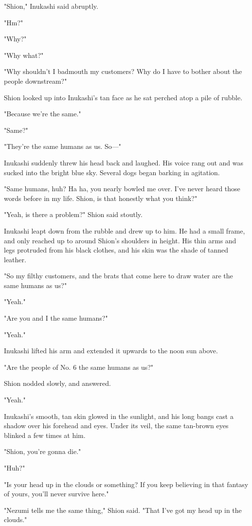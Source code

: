 "Shion," Inukashi said abruptly.

"Hm?"

"Why?"

"Why what?"

"Why shouldn't I badmouth my customers? Why do I have to bother about
the people downstream?"

Shion looked up into Inukashi's tan face as he sat perched atop a pile
of rubble.

"Because we're the same."

"Same?"

"They're the same humans as us. So---"

Inukashi suddenly threw his head back and laughed. His voice rang out
and was sucked into the bright blue sky. Several dogs began barking in
agitation.

"Same humans, huh? Ha ha, you nearly bowled me over. I've never heard
those words before in my life. Shion, is that honestly what you think?"

"Yeah, is there a problem?" Shion said stoutly.

Inukashi leapt down from the rubble and drew up to him. He had a small
frame, and only reached up to around Shion's shoulders in height. His
thin arms and legs protruded from his black clothes, and his skin was
the shade of tanned leather.

"So my filthy customers, and the brats that come here to draw water are
the same humans as us?"

"Yeah."

"Are you and I the same humans?"

"Yeah."

Inukashi lifted his arm and extended it upwards to the noon sun above.

"Are the people of No. 6 the same humans as us?"

Shion nodded slowly, and answered.

"Yeah."

Inukashi's smooth, tan skin glowed in the sunlight, and his long bangs
cast a shadow over his forehead and eyes. Under its veil, the same
tan-brown eyes blinked a few times at him.

"Shion, you're gonna die."

"Huh?"

"Is your head up in the clouds or something? If you keep
believing in that fantasy of yours, you'll never survive here."

"Nezumi tells me the same thing," Shion said. "That I've got my head up
in the clouds."


